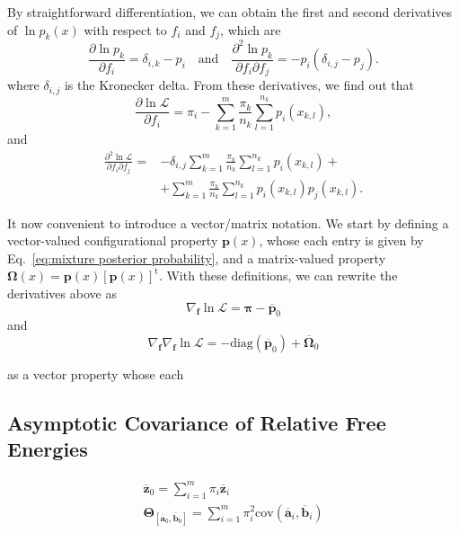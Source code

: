\documentclass[aip,jcp,reprint,amsmath,amssymb]{revtex4-1}
\newcommand{\mt}[1]{\boldsymbol{\mathbf{#1}}}           %
\newcommand{\vt}[1]{\boldsymbol{\mathbf{#1}}}           %
\newcommand{\tr}[1]{#1^\text{t}}                        %
\begin{document}
By straightforward differentiation, we can obtain the first and second derivatives of $\ln p_k(x)$ with respect to $f_i$ and $f_j$, which are \begin{equation*}
\frac{\partial \ln p_k}{\partial f_i} = \delta_{i,k} - p_i \quad \text{and} \quad \frac{\partial^2\ln p_k}{\partial f_i \partial f_j} = -p_i(\delta_{i,j} - p_j).
\end{equation*}
where $\delta_{i,j}$ is the Kronecker delta. From these derivatives, we find out that
\begin{equation*}
\frac{\partial \ln \mathcal L}{\partial f_i} = \pi_i - \sum_{k=1}^m \frac{\pi_k}{n_k} \sum_{l=1}^{n_k} p_i(x_{k,l}),
\end{equation*}
and
\begin{align*}
\frac{\partial^2 \ln \mathcal L}{\partial f_i \partial f_j} = &-\delta_{i,j} \sum_{k=1}^m \frac{\pi_k}{n_k} \sum_{l=1}^{n_k} p_i(x_{k,l}) + \\
&+ \sum_{k=1}^m \frac{\pi_k}{n_k} \sum_{l=1}^{n_k} p_i(x_{k,l}) p_j(x_{k,l}).
\end{align*}

It now convenient to introduce a vector/matrix notation. We start by defining a vector-valued configurational property $\vt p(x)$, whose each entry is given by Eq.~\eqref{eq:mixture posterior probability}, and a matrix-valued property $\mt \Omega(x) = {\vt p}(x)\tr{[{\vt p}(x)]}$. With these definitions, we can rewrite the derivatives above as
\begin{equation}
\nabla_{\vt f} \ln \mathcal L = \vt \pi - \overline{\vt p}_0
\end{equation}
and
\begin{equation}
\nabla_{\vt f} \nabla_{\vt f} \ln \mathcal L = -\text{diag}(\overline{\vt p}_0) + \overline{\mt \Omega}_0
\end{equation}

as a vector property whose each 


\subsection{Asymptotic Covariance of Relative Free Energies}

\begin{gather}
\overline{\vt z}_0 = \sum_{i=1}^m \pi_i \overline{\vt z}_i \\
\mt \Theta_{[\overline{\vt a}_0,\overline{\vt b}_0]} = \sum_{i=1}^m \pi_i^2 \text{cov}(\overline{\vt a}_i,\overline{\vt b}_i)
\end{gather}
\end{document}
